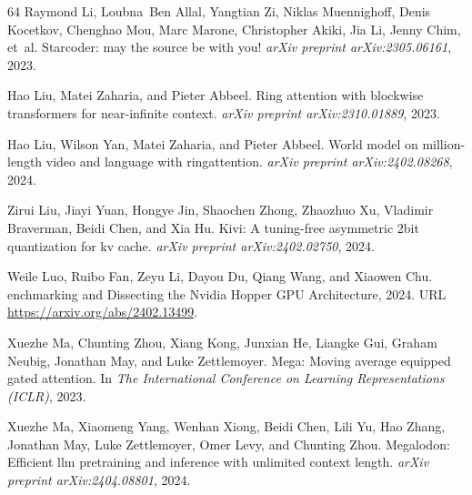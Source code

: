\documentclass{article}
\begin{document}
\begin{thebibliography}{64}
Raymond Li, Loubna~Ben Allal, Yangtian Zi, Niklas Muennighoff, Denis Kocetkov,
  Chenghao Mou, Marc Marone, Christopher Akiki, Jia Li, Jenny Chim, et~al.
\newblock Starcoder: may the source be with you!
\newblock \emph{arXiv preprint arXiv:2305.06161}, 2023.

Hao Liu, Matei Zaharia, and Pieter Abbeel.
\newblock Ring attention with blockwise transformers for near-infinite context.
\newblock \emph{arXiv preprint arXiv:2310.01889}, 2023.

Hao Liu, Wilson Yan, Matei Zaharia, and Pieter Abbeel.
\newblock World model on million-length video and language with ringattention.
\newblock \emph{arXiv preprint arXiv:2402.08268}, 2024{}.

Zirui Liu, Jiayi Yuan, Hongye Jin, Shaochen Zhong, Zhaozhuo Xu, Vladimir
  Braverman, Beidi Chen, and Xia Hu.
\newblock Kivi: A tuning-free asymmetric 2bit quantization for kv cache.
\newblock \emph{arXiv preprint arXiv:2402.02750}, 2024{}.

Weile Luo, Ruibo Fan, Zeyu Li, Dayou Du, Qiang Wang, and Xiaowen Chu.
enchmarking and {D}issecting the {N}vidia {H}opper {GPU}
  {A}rchitecture, 2024.
\newblock URL \url{https://arxiv.org/abs/2402.13499}.

Xuezhe Ma, Chunting Zhou, Xiang Kong, Junxian He, Liangke Gui, Graham Neubig,
  Jonathan May, and Luke Zettlemoyer.
\newblock Mega: Moving average equipped gated attention.
\newblock In \emph{The International Conference on Learning Representations
  ({ICLR})}, 2023.

Xuezhe Ma, Xiaomeng Yang, Wenhan Xiong, Beidi Chen, Lili Yu, Hao Zhang,
  Jonathan May, Luke Zettlemoyer, Omer Levy, and Chunting Zhou.
\newblock Megalodon: Efficient llm pretraining and inference with unlimited
  context length.
\newblock \emph{arXiv preprint arXiv:2404.08801}, 2024.


\end{thebibliography}
\end{document}

